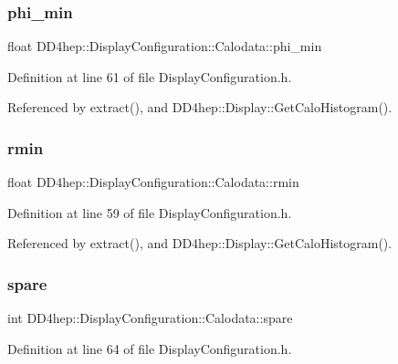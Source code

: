 \subsubsection{\texorpdfstring{phi\+\_\+min}{phi\_min}}
{\footnotesize\ttfamily float D\+D4hep\+::\+Display\+Configuration\+::\+Calodata\+::phi\+\_\+min}



Definition at line 61 of file Display\+Configuration.\+h.



Referenced by extract(), and D\+D4hep\+::\+Display\+::\+Get\+Calo\+Histogram().

\hypertarget{struct_d_d4hep_1_1_display_configuration_1_1_calodata_ad66aad4f3af180d086d38e843e85aacf}{}\label{struct_d_d4hep_1_1_display_configuration_1_1_calodata_ad66aad4f3af180d086d38e843e85aacf} 
\subsubsection{\texorpdfstring{rmin}{rmin}}
{\footnotesize\ttfamily float D\+D4hep\+::\+Display\+Configuration\+::\+Calodata\+::rmin}



Definition at line 59 of file Display\+Configuration.\+h.



Referenced by extract(), and D\+D4hep\+::\+Display\+::\+Get\+Calo\+Histogram().

\hypertarget{struct_d_d4hep_1_1_display_configuration_1_1_calodata_abda3e84b84be3024b62145411f0f125e}{}\label{struct_d_d4hep_1_1_display_configuration_1_1_calodata_abda3e84b84be3024b62145411f0f125e} 
\subsubsection{\texorpdfstring{spare}{spare}}
{\footnotesize\ttfamily int D\+D4hep\+::\+Display\+Configuration\+::\+Calodata\+::spare}



Definition at line 64 of file Display\+Configuration.\+h.

